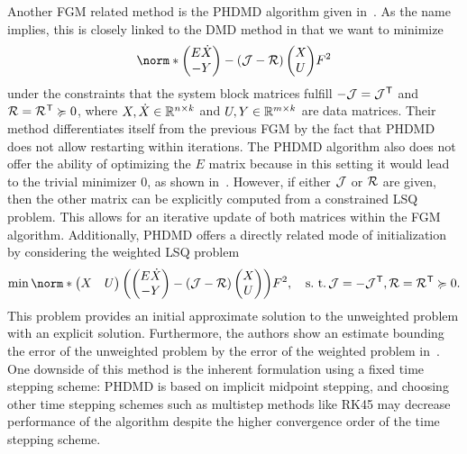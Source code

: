 Another \ac{FGM} related method is the \ac{PHDMD} algorithm given in~\cite{Morandin2023}.
As the name implies, this is closely linked to the \ac{DMD} method in that we want to minimize
\begin{equation}\label{eq:ph-dmd-minimization-problem}
    \norm*{\begin{pmatrix}
        E \dot{X} \\
        -Y
    \end{pmatrix} - (\mcl{J} - \mcl{R}) \begin{pmatrix}
        X \\
        U
    \end{pmatrix}}{F}^2
\end{equation}
under the constraints that the system block matrices fulfill $-\mathcal{J} = \mathcal{J}^{\mkern1mu \mathsf{T}}$ and $\mathcal{R} = \mathcal{R}^{\mkern1mu \mathsf{T}} \succcurlyeq 0$, where $X, \dot{X} \in \mathbb{R}^{n \times k}$ and $U, Y \in \mathbb{R}^{m \times k}$ are data matrices.
Their method differentiates itself from the previous \ac{FGM} by the fact that \ac{PHDMD} does not allow restarting within iterations.
The \ac{PHDMD} algorithm also does not offer the ability of optimizing the $E$ matrix because in this setting it would lead to the trivial minimizer $0$, as shown in~\cite[Remark~3.3]{Morandin2023}.
However, if either $\mathcal{J}$ or $\mathcal{R}$ are given, then the other matrix can be explicitly computed from a constrained \ac{LSQ} problem.
This allows for an iterative update of both matrices within the \ac{FGM} algorithm.
Additionally, \ac{PHDMD} offers a directly related mode of initialization by considering the weighted \ac{LSQ} problem
\begin{equation*}
    \min \norm*{\begin{pmatrix}
        X & U
    \end{pmatrix} \left( \begin{pmatrix}
        E \dot{X} \\
        -Y
    \end{pmatrix} - (\mcl{J} - \mcl{R}) \begin{pmatrix}
        X \\
        U
    \end{pmatrix} \right)}{F}^2,\quad \suchthat \mcl{J} = - \mcl{J}\trans, \mcl{R} = \mcl{R}\trans \succcurlyeq 0.
\end{equation*}
This problem provides an initial approximate solution to the unweighted problem with an explicit solution.
Furthermore, the authors show an estimate bounding the error of the unweighted problem by the error of the weighted problem in~\cite[Lemma~3.11]{Morandin2023}.
One downside of this method is the inherent formulation using a fixed time stepping scheme: \ac{PHDMD} is based on implicit midpoint stepping, and choosing other time stepping schemes such as multistep methods like RK45 may decrease performance of the algorithm despite the higher convergence order of the time stepping scheme.

